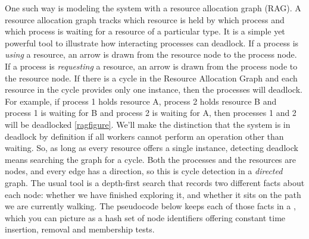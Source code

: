 One such way is modeling the system with a resource allocation graph (RAG).
A resource allocation graph tracks which resource is held by which process and which process is waiting for a resource of a particular type.
It is a simple yet powerful tool to illustrate how interacting processes can deadlock.
If a process is \emph{using} a resource, an arrow is drawn from the resource node to the process node.
If a process is \emph{requesting} a resource, an arrow is drawn from the process node to the resource node.
If there is a cycle in the Resource Allocation Graph and each resource in the cycle provides only one instance, then the processes will deadlock.
For example, if process 1 holds resource A, process 2 holds resource B and process 1 is waiting for B and process 2 is waiting for A, then processes 1 and 2 will be deadlocked \ref{ragfigure}.
We'll make the distinction that the system is in deadlock by definition if all workers cannot perform an operation other than waiting.
So, as long as every resource offers a single instance, detecting deadlock means searching the graph for a cycle.
Both the processes and the resources are nodes, and every edge has a direction, so this is cycle detection in a \emph{directed} graph.
The usual tool is a depth-first search that records two different facts about each node: whether we have finished exploring it, and whether it sits on the path we are currently walking.
The pseudocode below keeps each of those facts in a , which you can picture as a hash set of node identifiers offering constant time insertion, removal and membership tests.

